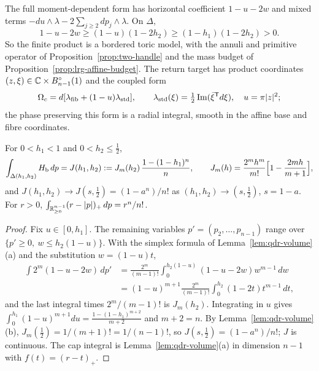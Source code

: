 The full moment-dependent form has horizontal coefficient $1-u-2w$ and mixed terms
$-du\wedge\lambda-2\sum_{j\ge2}dp_j\wedge\lambda$. On $\Delta$,
\begin{equation}\label{eq:lrg-mixed-positive}
 1-u-2w\ge(1-u)(1-2h_2)\ge(1-h_1)(1-2h_2)>0.
\end{equation}
So the finite product is a bordered toric model, with the annuli and primitive operator of
Proposition~\ref{prop:two-handle} and the mass budget of Proposition~\ref{prop:lrg-affine-budget}.
The return target has product coordinates $(z,\xi)\in\mathbb{C}\times B^{\circ}_{n-1}(1)$ and the coupled form
\[
 \Omega_c=d[\lambda_{\rm fib}+(1-u)\lambda_{\rm std}],\qquad
 \lambda_{\rm std}(\xi)=\tfrac12\operatorname{Im}(\bar\xi^{\mathsf T}d\xi),\quad u=\pi|z|^2;
\]
the phase preserving this form is a radial integral, smooth in the affine base and fibre coordinates.

\begin{lemma}\label{lem:lrg-mixed-volume}
For $0<h_1<1$ and $0<h_2\le\frac12$,
\[
 \int_{\Delta(h_1,h_2)}H_{\mathrm b}\,dp=J(h_1,h_2):=J_m(h_2)\,\frac{1-(1-h_1)^n}{n},\qquad
 J_m(h)=\frac{2^mh^m}{m!}\Bigl[1-\frac{2mh}{m+1}\Bigr],
\]
and $J(h_1,h_2)\to J(s,\frac12)=(1-a^n)/n!$ as $(h_1,h_2)\to(s,\frac12)$, $s=1-a$. For $r>0$,
$\int_{\mathbb{R}^{n-1}_{\ge0}}(r-|p|)_+\,dp=r^n/n!$.
\end{lemma}

\begin{proof}
Fix $u\in[0,h_1]$. The remaining variables $p'=(p_2,\dots,p_{n-1})$ range over $\{p'\ge0,\ w\le h_2(1-u)\}$. With
the simplex formula of Lemma~\ref{lem:qdr-volume}(a) and the substitution $w=(1-u)t$,
\begin{align*}
 \int 2^m(1-u-2w)\,dp'&=\frac{2^m}{(m-1)!}\int_0^{h_2(1-u)}(1-u-2w)w^{m-1}\,dw\\
 &=(1-u)^{m+1}\frac{2^m}{(m-1)!}\int_0^{h_2}(1-2t)t^{m-1}\,dt,
\end{align*}
and the last integral times $2^m/(m-1)!$ is $J_m(h_2)$. Integrating in $u$ gives
$\int_0^{h_1}(1-u)^{m+1}du=\frac{1-(1-h_1)^{m+2}}{m+2}$ and $m+2=n$. By Lemma~\ref{lem:qdr-volume}(b),
$J_m(\frac12)=1/(m+1)!=1/(n-1)!$, so $J(s,\frac12)=(1-a^n)/n!$; $J$ is continuous. The cap integral is
Lemma~\ref{lem:qdr-volume}(a) in dimension $n-1$ with $f(t)=(r-t)_+$.
\end{proof}

